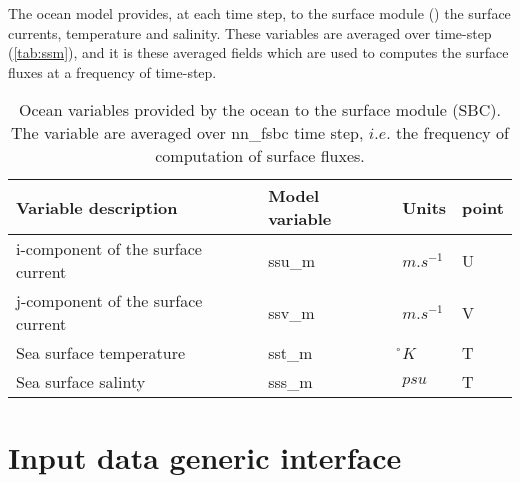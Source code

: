 \documentclass[../tex_main/NEMO_manual]{subfiles}
\begin{document}
The ocean model provides, at each time step, to the surface module ()
the surface currents, temperature and salinity.  
These variables are averaged over  time-step (\autoref{tab:ssm}), and
it is these averaged fields which are used to computes the surface fluxes at a frequency of  time-step.


\begin{table}[tb]   \begin{center}   \begin{tabular}{|l|l|l|l|}
\hline
Variable description					& Model variable	& Units	& point \\	\hline
i-component of the surface current	& ssu\_m	& $m.s^{-1}$	& U \\	\hline
j-component of the surface current	& ssv\_m	& $m.s^{-1}$	& V \\	\hline
Sea surface temperature				& sst\_m	& \r{}$K$		& T \\	\hline
Sea surface salinty					& sss\_m	& $psu$			& T \\	\hline
\end{tabular}
\caption{  \protect\label{tab:ssm}
  Ocean variables provided by the ocean to the surface module (SBC).
  The variable are averaged over nn{\_}fsbc time step,
  $i.e.$ the frequency of computation of surface fluxes.}
\end{center}   \end{table}



\section{Input data generic interface}
\label{sec:SBC_input}
\end{document}
